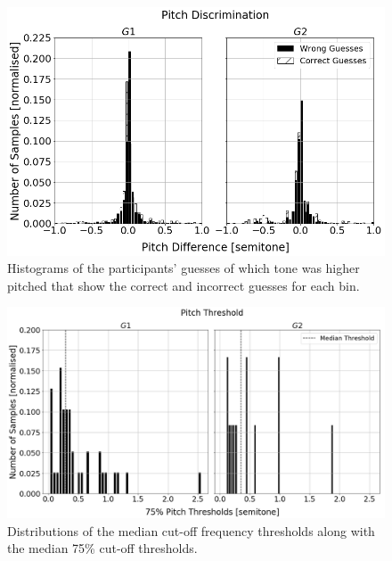 \documentclass{article}
\begin{document}
\begin{figure}
  \centering
  \includegraphics[width=1.0\textwidth]{figures/pitch_discrimination.png}
  \caption{Histograms of the participants' guesses of which tone was higher pitched that show the correct and incorrect guesses for each bin. }\label{fig:pitch-discrimination}
\end{figure}

\begin{figure}
  \centering
  \includegraphics[width=1.0\textwidth]{figures/pitch_thresholds.png}
  \caption{Distributions of the median cut-off frequency thresholds along with the median 75\% cut-off thresholds. }\label{fig:pitch-thresholds}
\end{figure}
\end{document}
